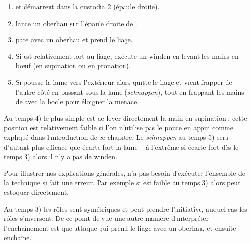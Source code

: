 \begin{technique}[Liegniczer 1]

\begin{enumerate}
	\item \A et \D démarrent dans la custodia 2 (épaule droite).
	
	\item \A lance un oberhau sur l'épaule droite de \D.
	
	\item \D pare avec un oberhau et prend le liage.
	
	\item {}
		Si \D est relativement fort au liage, \A exécute un winden en levant les mains en bœuf (en supination ou en pronation).
	
	\item {}
		Si \D pousse la lame vers l'extérieur alors \A quitte le liage et vient frapper \D de l'autre côté en passant sous la lame (\emph{schnappen}),
		tout en frappant les mains de \D avec la bocle pour éloigner la menace.
\end{enumerate}

Au temps 4) le plus simple est de lever directement la main en supination ; cette position est relativement faible si l'on n'utilise pas le pouce en appui comme expliqué dans l'introduction de ce chapitre.
Le \emph{schnappen} au temps 5) sera d'autant plus efficace que \D écarte fort la lame – à l'extrême si \D écarte fort dès le temps 3) alors il n'y a pas de winden.

Pour illustrer nos explications générales, \A n'a pas besoin d'exécuter l'ensemble de la technique si \D fait une erreur.
Par exemple si \D est faible au temps 3) alors \A peut estoquer directement.

Au temps 3) les rôles sont symétriques et \D peut prendre l'initiative, auquel cas les rôles s'inversent.
De ce point de vue une autre manière d'interpréter l'enchaînement est que \D attaque \A qui prend le liage avec un oberhau, et ensuite enchaîne.


\end{technique}

